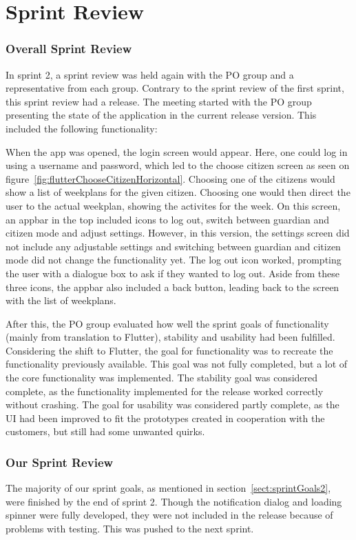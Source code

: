 \section{Sprint Review}
\subsubsection{Overall Sprint Review}
In sprint 2, a sprint review was held again with the PO group and a representative from each group. Contrary to the sprint review of the first sprint, this sprint review had a release. The meeting started with the PO group presenting the state of the application in the current release version. This included the following functionality:

When the app was opened, the login screen would appear. Here, one could log in using a username and password, which led to the choose citizen screen as seen on figure~\ref{fig:flutterChooseCitizenHorizontal}. Choosing one of the citizens would show a list of weekplans for the given citizen. Choosing one would then direct the user to the actual weekplan, showing the activites for the week. On this screen, an appbar in the top included icons to log out, switch between guardian and citizen mode and adjust settings. However, in this version, the settings screen did not include any adjustable settings and switching between guardian and citizen mode did not change the functionality yet. The log out icon worked, prompting the user with a dialogue box to ask if they wanted to log out. Aside from these three icons, the appbar also included a back button, leading back to the screen with the list of weekplans. 

After this, the PO group evaluated how well the sprint goals of functionality (mainly from translation to Flutter), stability and usability had been fulfilled. 
Considering the shift to Flutter, the goal for functionality was to recreate the functionality previously available. This goal was not fully completed, but a lot of the core functionality was implemented.
The stability goal was considered complete, as the functionality implemented for the release worked correctly without crashing. 
The goal for usability was considered partly complete, as the UI had been improved to fit the prototypes created in cooperation with the customers, but still had some unwanted quirks. 

\subsubsection{Our Sprint Review}
The majority of our sprint goals, as mentioned in section~\ref{sect:sprintGoals2}, were finished by the end of sprint 2. Though the notification dialog and loading spinner were fully developed, they were not included in the release because of problems with testing. This was pushed to the next sprint.


